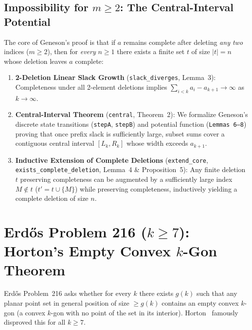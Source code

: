 \documentclass[10pt,twocolumn]{article}
\theoremstyle{definition}
\begin{document}
\subsection{Impossibility for $m \ge 2$: The Central-Interval Potential}
The core of Geneson's proof is that if $a$ remains complete after deleting \emph{any two} indices ($m \ge 2$), then for \emph{every} $n \ge 1$ there exists a finite set $t$ of size $|t| = n$ whose deletion leaves $a$ complete:
\begin{enumerate}[leftmargin=1.4em,itemsep=1pt]
  \item \textbf{2-Deletion Linear Slack Growth} (\texttt{slack\_diverges}, Lemma~3): Completeness under all 2-element deletions implies $\sum_{i < k} a_i - a_{k+1} \to \infty$ as $k \to \infty$.
  \item \textbf{Central-Interval Theorem} (\texttt{central}, Theorem~2): We formalize Geneson's discrete state transitions (\texttt{stepA}, \texttt{stepB}) and potential function (\texttt{Lemmas 6--8}) proving that once prefix slack is sufficiently large, subset sums cover a contiguous central interval $[L_k, R_k]$ whose width exceeds $a_{k+1}$.
  \item \textbf{Inductive Extension of Complete Deletions} (\texttt{extend\_core}, \texttt{exists\_complete\_deletion}, Lemma~4 \& Proposition~5): Any finite deletion $t$ preserving completeness can be augmented by a sufficiently large index $M \notin t$ ($t' = t \cup \{M\}$) while preserving completeness, inductively yielding a complete deletion of size $n$.
\end{enumerate}

\section{Erd\H{o}s Problem 216 ($k \ge 7$): Horton's Empty Convex $k$-Gon Theorem}

Erd\H{o}s Problem~216 asks whether for every $k$ there exists $g(k)$ such that any planar point set in general position of size $\ge g(k)$ contains an empty convex $k$-gon (a convex $k$-gon with no point of the set in its interior). Horton~\cite{Horton1983} famously disproved this for all $k \ge 7$.
\end{document}
